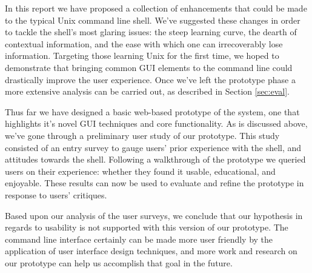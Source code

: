 In this report we have proposed a collection of enhancements that
could be made to the typical Unix command line shell. We've suggested these
changes in order to tackle the shell's most glaring issues: the steep learning
curve, the dearth of contextual information, and the ease with which one can
irrecoverably lose information. Targeting those learning Unix for the first
time, we hoped to demonstrate that bringing common GUI elements to the command
line could drastically improve the user experience. Once we've left the
prototype phase a more extensive analysis can be carried out, as described in
Section \ref{sec:eval}.

Thus far we have designed a basic web-based prototype of the system, one that
highlights it's novel GUI techniques and core functionality. As is discussed
above, we've gone through a preliminary user study of our prototype. This study
consisted of an entry survey to gauge users' prior experience with the shell,
and attitudes towards the shell. Following a walkthrough of the prototype we
queried users on their experience: whether they found it usable, educational,
and enjoyable. These results can now be used to evaluate and refine the
prototype in response to users' critiques.

Based upon our analysis of the user surveys, we conclude that our hypothesis in
regards to usability is not supported with this version of our prototype. The
command line interface certainly can be made more user friendly by the
application of user interface design techniques, and more work and research on
our prototype can help us accomplish that goal in the future.




